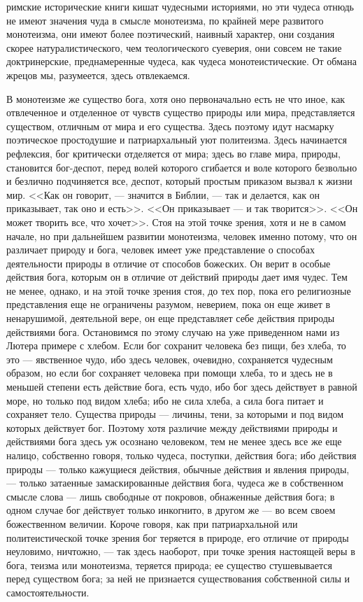 \documentclass[12pt]{article}
\begin{document}
римские исторические книги кишат чудесными историями, но эти чудеса отнюдь не имеют значения чуда в смысле монотеизма, по крайней мере развитого монотеизма, они имеют более поэтический, наивный характер, они создания скорее натуралистического, чем теологического суеверия, они совсем не такие доктринерские, преднамеренные чудеса, как чудеса монотеистические. От обмана жрецов мы, разумеется, здесь отвлекаемся. 

В монотеизме же существо бога, хотя оно первоначально есть не что иное, как отвлеченное и отделенное от чувств существо природы или мира, представляется существом, отличным от мира и его существа. Здесь поэтому идут насмарку поэтическое простодушие и патриархальный уют политеизма. Здесь начинается рефлексия, бог критически отделяется от мира; здесь во главе мира, природы, становится бог-деспот, перед волей которого сгибается и воле которого безвольно и безлично подчиняется все, деспот, который простым приказом вызвал к жизни мир. <<Как он говорит, --- значится в Библии, --- так и делается, как он приказывает, так оно и есть>>. <<Он приказывает --- и так творится>>. <<Он может творить все, что хочет>>. Стоя на этой точке зрения, хотя и не в самом начале, но при дальнейшем развитии монотеизма, человек именно потому, что он различает природу и бога, человек имеет уже представление о способах деятельности природы в отличие от способов божеских. Он верит в особые действия бога, которым он в отличие от действий природы дает имя чудес. Тем не менее, однако, и на этой точке зрения стоя, до тех пор, пока его религиозные представления еще не ограничены разумом, неверием, пока он еще живет в ненарушимой, деятельной вере, он еще представляет себе действия природы действиями бога. Остановимся по этому случаю на уже приведенном нами из Лютера примере с хлебом. Если бог сохранит человека без пищи, без хлеба, то это --- явственное чудо, ибо здесь человек, очевидно, сохраняется чудесным образом, но если бог сохраняет человека при помощи хлеба, то и здесь не в меньшей степени есть действие бога, есть чудо, ибо бог здесь действует в равной море, но только под видом хлеба; ибо не сила хлеба, а сила бога питает и сохраняет тело. Существа природы --- личины, тени, за которыми и под видом которых действует бог. Поэтому хотя различие между действиями природы и действиями бога здесь уж осознано человеком, тем не менее здесь все же еще налицо, собственно говоря, только чудеса, поступки, действия бога; ибо действия природы --- только кажущиеся действия, обычные действия и явления природы, --- только затаенные замаскированные действия бога, чудеса же в собственном смысле слова --- лишь свободные от покровов, обнаженные действия бога; в одном случае бог действует только инкогнито, в другом же --- во всем своем божественном величии. Короче говоря, как при патриархальной или политеистической точке зрения бог теряется в природе, его отличие от природы неуловимо, ничтожно, --- так здесь наоборот, при точке зрения настоящей веры в бога, теизма или монотеизма, теряется природа; ее существо стушевывается перед существом бога; за ней не признается существования собственной силы и самостоятельности. 
\end{document}
